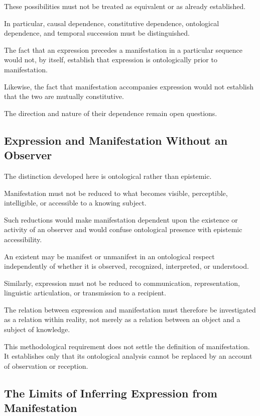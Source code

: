 These possibilities must not be treated as equivalent
or as already established.

In particular, causal dependence, constitutive dependence,
ontological dependence, and temporal succession must
be distinguished.

The fact that an expression precedes a manifestation
in a particular sequence would not, by itself, establish
that expression is ontologically prior to manifestation.

Likewise, the fact that manifestation accompanies expression
would not establish that the two are mutually constitutive.

The direction and nature of their dependence remain
open questions.

\subsection{Expression and Manifestation Without an Observer}

The distinction developed here is ontological rather
than epistemic.

Manifestation must not be reduced to what becomes visible,
perceptible, intelligible, or accessible to a knowing subject.

Such reductions would make manifestation dependent upon
the existence or activity of an observer and would confuse
ontological presence with epistemic accessibility.

An existent may be manifest or unmanifest in an ontological
respect independently of whether it is observed, recognized,
interpreted, or understood.

Similarly, expression must not be reduced to communication,
representation, linguistic articulation, or transmission
to a recipient.

The relation between expression and manifestation must
therefore be investigated as a relation within reality,
not merely as a relation between an object and a subject
of knowledge.

This methodological requirement does not settle the
definition of manifestation. It establishes only that
its ontological analysis cannot be replaced by an account
of observation or reception.

\subsection{The Limits of Inferring Expression from Manifestation}

